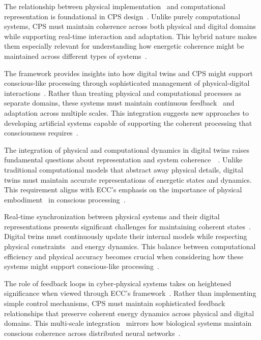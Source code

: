 The relationship between physical implementation~ and computational representation is foundational in CPS design~\cite{Tao2019,Wheeler2005}. Unlike purely computational systems, CPS must maintain coherence across both physical and digital domains while supporting real-time interaction and adaptation. This hybrid nature makes them especially relevant for understanding how energetic coherence might be maintained across different types of systems~\cite{Uhlemann2017,Shanahan2010}.

The framework provides insights into how digital twins and CPS might support conscious-like processing through sophisticated management of physical-digital interactions~. Rather than treating physical and computational processes as separate domains, these systems must maintain continuous feedback~ and adaptation across multiple scales. This integration suggests new approaches to developing artificial systems capable of supporting the coherent processing that consciousness requires~\cite{White2021,butlin2023consciousnessartificialintelligenceinsights}.

The integration of physical and computational dynamics in digital twins raises fundamental questions about representation and system coherence~~\cite{Fuller2020,Clark2013}. Unlike traditional computational models that abstract away physical details, digital twins must maintain accurate representations of energetic states and dynamics. This requirement aligns with ECC's emphasis on the importance of physical embodiment~ in conscious processing~\cite{Jones2020,Thompson2007}.

Real-time synchronization between physical systems and their digital representations presents significant challenges for maintaining coherent states~. Digital twins must continuously update their internal models while respecting physical constraints~ and energy dynamics. This balance between computational efficiency and physical accuracy becomes crucial when considering how these systems might support conscious-like processing~\cite{Minerva2020,Wolpert2019}.

The role of feedback loops in cyber-physical systems takes on heightened significance when viewed through ECC's framework~\cite{Lee2018,Freeman2006nonlinear}. Rather than implementing simple control mechanisms, CPS must maintain sophisticated feedback relationships that preserve coherent energy dynamics across physical and digital domains. This multi-scale integration~ mirrors how biological systems maintain conscious coherence across distributed neural networks~\cite{Rajkumar2018,sporns2011networks}.

